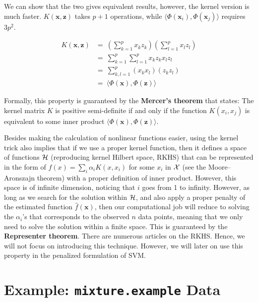 \documentclass[
]{book}
\theoremstyle{definition}
\theoremstyle{definition}
\theoremstyle{definition}
\theoremstyle{definition}
\theoremstyle{remark}
\begin{document}
We can show that the two gives equivalent results, however, the kernel version is much faster. \(K(\mathbf{x}, \mathbf{z})\) takes \(p+1\) operations, while \(\langle \Phi(\mathbf{x}_i), \Phi(\mathbf{x}_j) \rangle\) requires \(3p^2\).

\begin{align}
K(\mathbf{x}, \mathbf{z}) &=~ \left(\sum_{k=1}^p x_k z_k\right) \left(\sum_{l=1}^p x_l z_l\right) \\
&=~ \sum_{k=1}^p \sum_{l=1}^p x_k z_k x_l z_l \\
&=~ \sum_{k, l=1}^p (x_k x_l) (z_k z_l) \\
&=~ \langle \Phi(\mathbf{x}),  \Phi(\mathbf{z}) \rangle
\end{align}

Formally, this property is guaranteed by the \textbf{Mercer's theorem} that states: The kernel matrix \(K\) is positive semi-definite if and only if the function \(K(x_i ,x_j)\) is equivalent to some inner product \(\langle \Phi(\mathbf{x}), \Phi(\mathbf{z}) \rangle\).

Besides making the calculation of nonlinear functions easier, using the kernel trick also implies that if we use a proper kernel function, then it defines a space of functions \({\cal H}\) (reproducing kernel Hilbert space, RKHS) that can be represented in the form of \(f(x) = \sum_i \alpha_i K(x, x_i)\) for some \(x_i\) in \({\cal X}\) (see the Moore--Aronszajn theorem) with a proper definition of inner product. However, this space is of infinite dimension, noticing that \(i\) goes from 1 to infinity. However, as long as we search for the solution within \({\cal H}\), and also apply a proper penalty of the estimated function \(\widehat{f}(\mathbf{x})\), then our computational job will reduce to solving the \(\alpha_i\)'s that corresponds to the observed \(n\) data points, meaning that we only need to solve the solution within a finite space. This is guaranteed by the \textbf{Representer theorem}. There are numerous articles on the RKHS. Hence, we will not focus on introducing this technique. However, we will later on use this property in the penalized formulation of SVM.

\hypertarget{example-mixture.example-data}{%
\section{\texorpdfstring{Example: \texttt{mixture.example} Data}{Example: mixture.example Data}}\label{example-mixture.example-data}}
\end{document}
